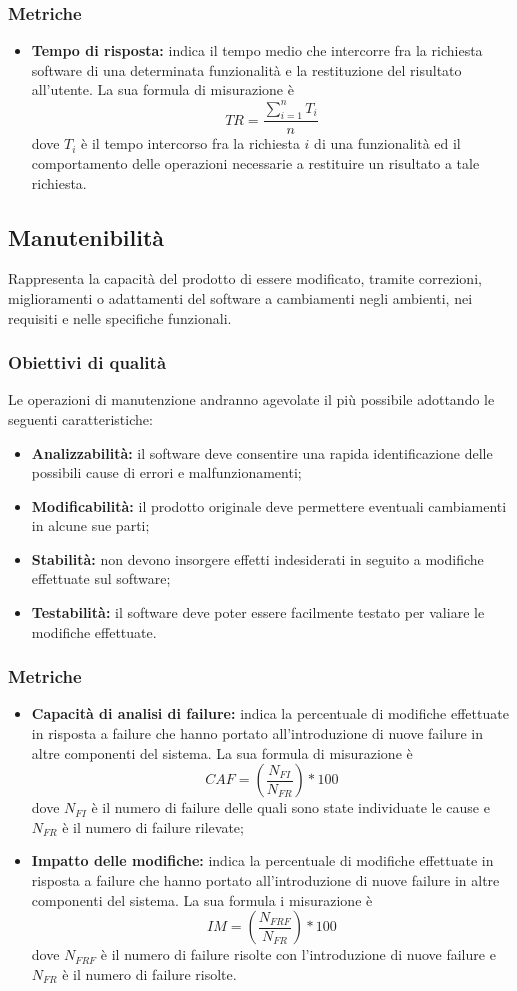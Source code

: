 \documentclass[PianoDiQualifica.tex]{subfiles}
\begin{document}
\subsubsection{Metriche}
\begin{itemize}
	\item \textbf{Tempo di risposta:} indica il tempo medio che intercorre fra la richiesta software di una determinata funzionalità e la restituzione del risultato all'utente. La sua formula di misurazione è \[TR=\frac{\sum_{i=1}^n T_i}{n}\] dove $ T_i $ è il tempo intercorso fra la richiesta $ i $ di una funzionalità ed il comportamento delle operazioni necessarie a restituire un risultato a tale richiesta.	
\end{itemize}
\subsection{Manutenibilità}
Rappresenta la capacità del prodotto di essere modificato, tramite correzioni, miglioramenti o adattamenti del software a cambiamenti negli ambienti, nei requisiti e nelle specifiche funzionali.
\subsubsection{Obiettivi di qualità}
Le operazioni di manutenzione andranno agevolate il più possibile adottando le seguenti caratteristiche:
\begin{itemize}
	\item \textbf{Analizzabilità:} il software deve consentire una rapida identificazione delle possibili cause di errori e malfunzionamenti;
	\item \textbf{Modificabilità:} il prodotto originale deve permettere eventuali cambiamenti in alcune sue parti;
	\item \textbf{Stabilità:} non devono insorgere effetti indesiderati in seguito a modifiche effettuate sul software;
	\item \textbf{Testabilità:} il software deve poter essere facilmente testato per valiare le modifiche effettuate.
\end{itemize}
\subsubsection{Metriche}
\begin{itemize}
	\item \textbf{Capacità di analisi di failure:} indica la percentuale di modifiche effettuate in risposta a failure che hanno portato all'introduzione di nuove failure in altre componenti del sistema. La sua formula di misurazione è \[CAF=(\frac{N_{FI}}{N_{FR}})*100\] dove $ N_{FI} $ è il numero di failure delle quali sono state individuate le cause e $ N_{FR} $ è il numero di failure rilevate;
	\item \textbf{Impatto delle modifiche:} indica la percentuale di modifiche effettuate in risposta a failure che hanno portato all'introduzione di nuove failure in altre componenti del sistema. La sua formula i misurazione è \[IM=(\frac{N_{FRF}}{N_{FR}})*100\] dove $ N_{FRF} $ è il numero di failure risolte con l'introduzione di nuove failure e $ N_{FR} $ è il numero di failure risolte.
\end{itemize}
\end{document}
